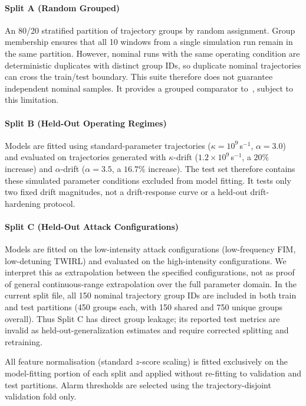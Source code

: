\documentclass[journal,twocolumn]{IEEEtran}
\newcommand{\kap}{\kappa}
\begin{document}
\paragraph{Split A (Random Grouped)}
An 80/20 stratified partition of trajectory groups by random assignment. Group
membership ensures that all 10 windows from a single simulation run remain in the
same partition. However, nominal runs with the same operating condition are
deterministic duplicates with distinct group IDs, so duplicate nominal trajectories
can cross the train/test boundary. This suite therefore does not guarantee
independent nominal samples. It provides a grouped comparator to~\cite{basepaper},
subject to this limitation.

\paragraph{Split B (Held-Out Operating Regimes)}
Models are fitted using standard-parameter trajectories
($\kap = 10^9$\,s$^{-1}$, $\alpha = 3.0$) and evaluated on trajectories generated
with $\kap$-drift ($1.2\times10^9$\,s$^{-1}$, a $20\%$ increase) and
$\alpha$-drift ($\alpha=3.5$, a $16.7\%$ increase). The test set therefore contains
these simulated parameter conditions excluded from model fitting. It tests only two
fixed drift magnitudes, not a drift-response curve or a held-out drift-hardening
protocol.

\paragraph{Split C (Held-Out Attack Configurations)}
Models are fitted on the low-intensity attack configurations (low-frequency FIM,
low-detuning TWIRL) and evaluated on the high-intensity configurations. We interpret
this as extrapolation between the specified configurations, not as proof of general
continuous-range extrapolation over the full parameter domain. In the current split
file, all 150 nominal trajectory group IDs are included in both train and test
partitions (450 groups each, with 150 shared and 750 unique groups overall). Thus
Split C has direct group leakage; its reported test metrics are invalid as
held-out-generalization estimates and require corrected splitting and retraining.

All feature normalisation (standard $z$-score scaling) is fitted exclusively on the
model-fitting portion of each split and applied without re-fitting to validation and
test partitions. Alarm thresholds are selected using the trajectory-disjoint
validation fold only.
\end{document}
